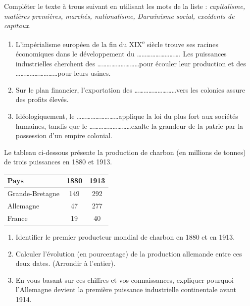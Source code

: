 \documentclass[11pt]{article}
\begin{document}
\begin{exercice}
Compléter le texte à trous suivant en utilisant les mots de la liste : \textit{capitalisme, matières premières, marchés, nationalisme, Darwinisme social, excédents de capitaux}.
\begin{enumerate}
    \item L'impérialisme européen de la fin du XIX\textsuperscript{e} siècle trouve ses racines économiques dans le développement du \ldots\ldots\ldots\ldots\ldots\ldots\ldots\ldots\ldots. Les puissances industrielles cherchent des \ldots\ldots\ldots\ldots\ldots\ldots\ldots\ldots\ldots pour écouler leur production et des \ldots\ldots\ldots\ldots\ldots\ldots\ldots\ldots\ldots pour leurs usines.
    \item Sur le plan financier, l'exportation des \ldots\ldots\ldots\ldots\ldots\ldots\ldots\ldots\ldots vers les colonies assure des profits élevés.
    \item Idéologiquement, le \ldots\ldots\ldots\ldots\ldots\ldots\ldots\ldots\ldots applique la loi du plus fort aux sociétés humaines, tandis que le \ldots\ldots\ldots\ldots\ldots\ldots\ldots\ldots\ldots exalte la grandeur de la patrie par la possession d'un empire colonial.
\end{enumerate}
\end{exercice}

\begin{exercice}
Le tableau ci-dessous présente la production de charbon (en millions de tonnes) de trois puissances en 1880 et 1913.
\begin{center}
\begin{tabular}{|l|c|c|}
\hline
\textbf{Pays} & \textbf{1880} & \textbf{1913} \\
\hline
Grande-Bretagne & 149 & 292 \\
Allemagne & 47 & 277 \\
France & 19 & 40 \\
\hline
\end{tabular}
\end{center}
\begin{enumerate}
    \item Identifier le premier producteur mondial de charbon en 1880 et en 1913.
    \item Calculer l'évolution (en pourcentage) de la production allemande entre ces deux dates. (Arrondir à l'entier).
    \item En vous basant sur ces chiffres et vos connaissances, expliquer pourquoi l'Allemagne devient la première puissance industrielle continentale avant 1914.
\end{enumerate}
\end{exercice}
\end{document}
